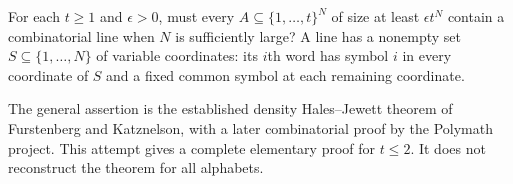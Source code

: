 For each $t\geq1$ and $\epsilon>0$, must every
$A\subseteq\{1,\ldots,t\}^N$ of size at least $\epsilon t^N$ contain
a combinatorial line when $N$ is sufficiently large?
A line has a nonempty set $S\subseteq\{1,\ldots,N\}$ of variable
coordinates: its $i$th word has symbol $i$ in every coordinate of $S$
and a fixed common symbol at each remaining coordinate.

The general assertion is the established density Hales--Jewett theorem
of Furstenberg and Katznelson, with a later combinatorial proof by the
Polymath project. This attempt gives a complete elementary proof for
$t\leq2$. It does not reconstruct the theorem for all alphabets.
